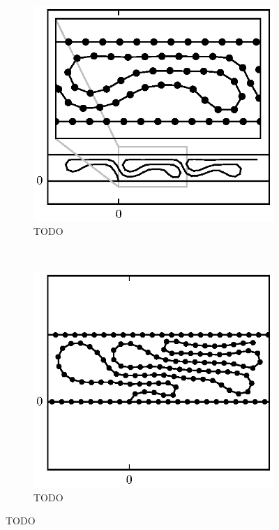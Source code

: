 	\begin{figure}
		\centering
		\begin{subfigure}{.5\textwidth}
			\centering
			\includegraphics{./fig/ch3/push/eb0.1/l20.5_m3.5.eps}
			\caption{TODO \label{subfig:push_crumple}}
		\end{subfigure}%
		~
		\begin{subfigure}{.5\textwidth}
			\centering
			\includegraphics{./fig/ch3/push/eb0.1_et0.1/l20_m2.eps}
			\caption{TODO \label{subfig:push_crumple2}}
		\end{subfigure}


\end{figure}
